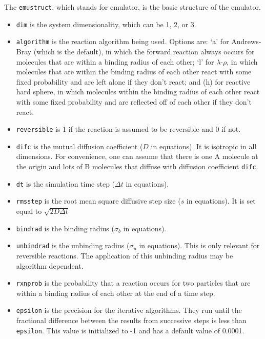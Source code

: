 \documentclass {book}
\newcommand {\ttt} {\texttt}
\begin{document}
The \ttt{emustruct}, which stands for emulator, is the basic structure of the emulator.

\begin{itemize}

\item \ttt{dim} is the system dimensionality, which can be 1, 2, or 3.

\item \ttt{algorithm} is the reaction algorithm being used.  Options are: `a' for Andrews-Bray (which is the default), in which the forward reaction always occurs for molecules that are within a binding radius of each other; `l' for $\lambda$-$\rho$, in which molecules that are within the binding radius of each other react with some fixed probability and are left alone if they don't react; and (h) for reactive hard sphere, in which molecules within the binding radius of each other react with some fixed probability and are reflected off of each other if they don't react.

\item \ttt{reversible} is 1 if the reaction is assumed to be reversible and 0 if not.

\item \ttt{difc} is the mutual diffusion coefficient ($D$ in equations). It is isotropic in all dimensions. For convenience, one can assume that there is one A molecule at the origin and lots of B molecules that diffuse with diffusion coefficient \ttt{difc}.

\item \ttt{dt} is the simulation time step ($\Delta t$ in equations).

\item \ttt{rmsstep} is the root mean square diffusive step size ($s$ in equations). It is set equal to $\sqrt{2D\Delta t}$

\item \ttt{bindrad} is the binding radius ($\sigma_b$ in equations).

\item \ttt{unbindrad} is the unbinding radius ($\sigma_u$ in equations). This is only relevant for reversible reactions.  The application of this unbinding radius may be algorithm dependent.

\item \ttt{rxnprob} is the probability that a reaction occurs for two particles that are within a binding radius of each other at the end of a time step.

\item \ttt{epsilon} is the precision for the iterative algorithms.  They run until the fractional difference between the results from successive steps is less than \ttt{epsilon}.  This value is initialized to -1 and has a default value of 0.0001.


\end{itemize}
\end{document}
